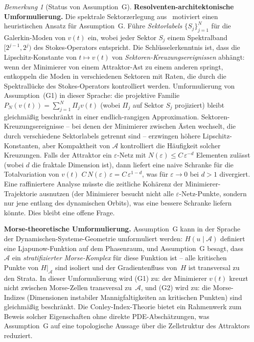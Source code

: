 \documentclass[12pt,a4paper]{article}
\theoremstyle{definition}
\theoremstyle{plain}
\theoremstyle{remark}
\newtheorem{remark}[definition]{Bemerkung}
\begin{document}
\begin{remark}[Status von Assumption~G]
\medskip\noindent
\textbf{Resolventen-architektonische Umformulierung.}\;
Die spektrale Sektorzerlegung aus~\cite{GeigerRH2026c}
motiviert einen heuristischen Ansatz für Assumption~G. Führe \emph{Sektorlabels}
$\{S_j\}_{j=1}^{N}$ für die Galerkin-Moden von $v(t)$ ein, wobei jeder Sektor
$S_j$ einem Spektralband $[2^{j-1}, 2^j)$ des Stokes-Operators entspricht. Die Schlüsselerkenntnis ist, dass die Lipschitz-Konstante von
$t \mapsto v(t)$ von \emph{Sektoren-Kreuzungsereignissen} abhängt: wenn der
Minimierer von einem Attraktor-Ast zu einem anderen springt, entkoppeln die Moden in
verschiedenen Sektoren mit Raten, die durch die Spektrallücke des
Stokes-Operators kontrolliert werden. Umformulierung von Assumption~(G1) in dieser Sprache:
die projektive Familie $P_N(v(t)) = \sum_{j=1}^{N} \Pi_j v(t)$ (wobei
$\Pi_j$ auf Sektor $S_j$ projiziert) bleibt gleichmäßig beschränkt in einer
endlich-rangigen Approximation. Sektoren-Kreuzungsereignisse -- bei denen der Minimierer
zwischen Ästen wechselt, die durch verschiedene Sektorlabels getrennt sind -- erzwingen
höhere Lipschitz-Konstanten, aber Kompaktheit von $\mathcal{A}$ kontrolliert
die Häufigkeit solcher Kreuzungen. Falls der Attraktor ein
$\varepsilon$-Netz mit $N(\varepsilon) \leq C\,\varepsilon^{-d}$
Elementen zulässt (wobei $d$ die fraktale Dimension ist), dann liefert eine naive Schranke für
die Totalvariation von $v(t)$
$C\,N(\varepsilon)\,\varepsilon = C\,\varepsilon^{1-d}$, was
für $\varepsilon \to 0$ bei $d > 1$ divergiert.  Eine raffiniertere Analyse
müsste die zeitliche Kohärenz der Minimierer-Trajektorie ausnutzen
(der Minimierer besucht nicht alle $\varepsilon$-Netz-Punkte, sondern nur jene
entlang des dynamischen Orbits), was eine bessere Schranke liefern könnte.
Dies bleibt eine offene Frage.

\medskip\noindent
\textbf{Morse-theoretische Umformulierung.}\;
Assumption~G kann in der Sprache der Dynamischen-Systeme-Geometrie
umformuliert werden: $H(u \mid \mathcal{A})$ definiert eine Ljapunow-Funktion auf dem
Phasenraum, und Assumption~G besagt, dass $\mathcal{A}$ ein
\emph{stratifizierter Morse-Komplex} für diese Funktion ist -- alle kritischen
Punkte von $H|_{\mathcal{A}}$ sind isoliert und der Gradientenfluss von~$H$
ist transversal zu den Strata. In dieser Umformulierung wird (G1) zu:
der Minimierer $v(t)$ kreuzt nicht zwischen Morse-Zellen
transversal zu~$\mathcal{A}$, und (G2) wird zu: die Morse-Indizes
(Dimensionen instabiler Mannigfaltigkeiten an kritischen Punkten) sind gleichmäßig
beschränkt. Die Conley-Index-Theorie bietet ein Rahmenwerk zum Beweis
solcher Eigenschaften ohne direkte PDE-Abschätzungen, was Assumption~G
auf eine topologische Aussage über die Zellstruktur des Attraktors reduziert.


\end{remark}
\end{document}
